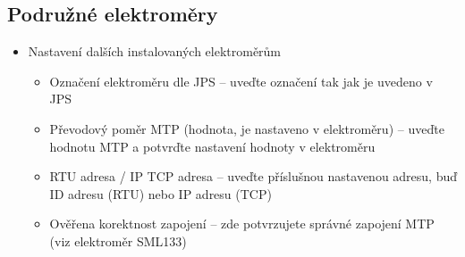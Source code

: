 {{        \subsection{Podružné elektroměry}
        \begin{itemize}
            \item Nastavení dalších instalovaných elektroměrům
            \begin{itemize}
                \item Označení elektroměru dle JPS – uveďte označení tak jak je uvedeno v JPS
                \item Převodový poměr MTP (hodnota, je nastaveno v elektroměru) – uveďte hodnotu MTP a potvrďte nastavení hodnoty v elektroměru
                \item RTU adresa / IP TCP adresa  – uveďte příslušnou nastavenou adresu, buď ID adresu (RTU) nebo IP adresu (TCP)
                \item Ověřena korektnost zapojení – zde potvrzujete správné zapojení MTP (viz elektroměr SML133)
            \end{itemize}
        \end{itemize}

        

    }

}

